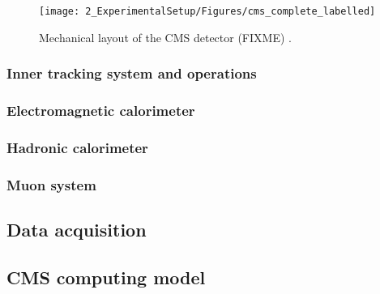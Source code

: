 \begin{figure}[ht]
   \centering
	\texttt{[image: 2\_ExperimentalSetup/Figures/cms\_complete\_labelled]}
	\caption{Mechanical layout of the CMS detector\cite{CMSdraw} (FIXME)
		.}
	\label{fig:CMS}
\end{figure}
	

\subsubsection{Inner tracking system and operations}
\subsubsection{Electromagnetic calorimeter}
\subsubsection{Hadronic calorimeter}
\subsubsection{Muon system}

\subsection{Data acquisition}
\subsection{CMS computing model}
